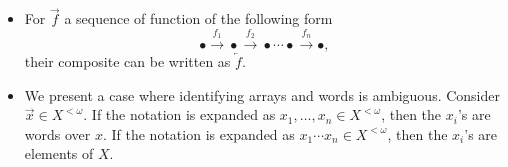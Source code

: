 \documentclass[a4paper, 8pt]{article}
\begin{document}
\begin{multicols}{2}
\begin{examples*}
	\begin{itemize}
		\item For $\overrightarrow{f}$ a sequence of function of the following form
			\[ \bullet \xrightarrow{f_1} \bullet \xrightarrow{f_2} \bullet \cdots \bullet \xrightarrow{f_n} \bullet , \]
			their composite can be written as $\overleftarrow{f}$.
		\item We present a case where identifying arrays and words is ambiguous. Consider $\overrightarrow{x} \in X^{< \omega}$. If the notation is expanded as $x_1, \ldots, x_n \in X^{< \omega}$, then the $x_i$'s are words over $x$. If the notation is expanded as $x_1 \cdots x_n \in X^{< \omega}$, then the $x_i$'s are elements of $X$.
	\end{itemize}
\end{examples*}



\end{multicols}
\end{document}
